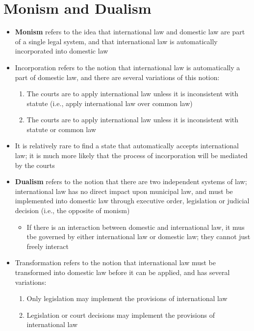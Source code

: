 \section{Monism and Dualism}\label{sec:Monism and Dualism}
\begin{itemize}
    \item \textbf{Monism} refers to the idea that international law and domestic law are part of a single legal system, and that international law is automatically incorporated into domestic law
    \item Incorporation refers to the notion that international law is automatically a part of domestic law, and there are several variations of this notion:
    \begin{enumerate}[label=(\alph*)]
        \item The courts are to apply international law unless it is inconsistent with statute (i.e., apply international law over common law)
        \item The courts are to apply international law unless it is inconsistent with statute or common law
    \end{enumerate}
    \item It is relatively rare to find a state that automatically accepts international law; it is much more likely that the process of incorporation will be mediated by the courts
    \item \textbf{Dualism} refers to the notion that there are two independent systems of law; international law has no direct impact upon municipal law, and must be implemented into domestic law through executive order, legislation or judicial decision (i.e., the opposite of monism)
    \begin{itemize}
        \item If there is an interaction between domestic and international law, it mus tbe governed by either international law or domestic law; they cannot just freely interact
    \end{itemize}
    \item Transformation refers to the notion that international law must be transformed into domestic law before it can be applied, and has several variations:
    \begin{enumerate}[label=(\alph*)]
        \item Only legislation may implement the provisions of international law
        \item Legislation or court decisions may implement the provisions of international law
    \end{enumerate}
\end{itemize}

